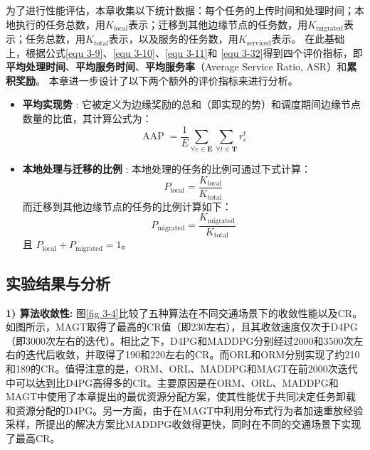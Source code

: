 为了进行性能评估，本章收集以下统计数据：每个任务的上传时间和处理时间；本地执行的任务总数，用$K_{\operatorname{local}}$表示；迁移到其他边缘节点的任务数，用$K_{\operatorname{migrated}}$表示；任务总数，用$K_{\operatorname{total}}$表示，以及服务的任务数，用$K_{\operatorname{serviced}}$表示。
在此基础上，根据公式\ref{equ 3-9}、\ref{equ 3-10}、\ref{equ 3-11}和 \ref{equ 3-32}得到四个评价指标，即\textbf{平均处理时间}、\textbf{平均服务时间}、\textbf{平均服务率}（Average Service Ratio, ASR）和\textbf{累积奖励}。
本章进一步设计了以下两个额外的评价指标来进行分析。
\begin{itemize}
	\item \textbf{平均实现势} : 它被定义为边缘奖励的总和（即实现的势）和调度期间边缘节点数量的比值，其计算公式为：
		\begin{equation}
		 	 \operatorname{AAP} = \frac{1}{E}\sum_{\forall e \in \mathbf{E}} \sum_{\forall t \in \mathbf{T}} r_{e}^{t}
		\end{equation}
	\item \textbf{本地处理与迁移的比例} : 本地处理的任务的比例可通过下式计算：
		\begin{equation}
			P_{\operatorname{local}} = \frac{K_{\operatorname{local}}}{K_{\operatorname{total}}}
		\end{equation}
		而迁移到其他边缘节点的任务的比例计算如下：
		\begin{equation}
			P_{\operatorname{migrated}} = \frac{K_{\operatorname{migrated}}}{K_{\operatorname{total}}}
		\end{equation}
		且 $P_{\operatorname{local}} +P_{\operatorname{migrated}} = 1$。
\end{itemize}

\subsection{实验结果与分析}

\textbf{1) 算法收敛性:} 图\ref{fig 3-4}比较了五种算法在不同交通场景下的收敛性能以及CR。如图所示，MAGT取得了最高的CR值（即230左右），且其收敛速度仅次于D4PG（即3000次左右的迭代）。相比之下，D4PG和MADDPG分别经过2000和3500次左右的迭代后收敛，并取得了190和220左右的CR。而ORL和ORM分别实现了约210和189的CR。值得注意的是，ORM、ORL、MADDPG和MAGT在前2000次迭代中可以达到比D4PG高得多的CR。主要原因是在ORM、ORL、MADDPG和MAGT中使用了本章提出的最优资源分配方案，使其性能优于共同决定任务卸载和资源分配的D4PG。另一方面，由于在MAGT中利用分布式行为者加速重放经验采样，所提出的解决方案比MADDPG收敛得更快，同时在不同的交通场景下实现了最高CR。

